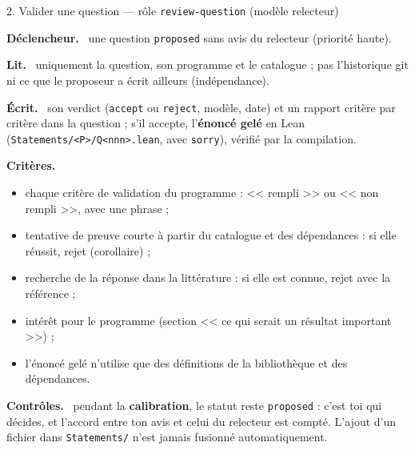 \documentclass[11pt,a4paper]{article}
\newcommand{\cmd}[1]{\texttt{#1}}
\newcommand{\rub}[1]{\par\smallskip\textsf{\textbf{#1.}}~}
\begin{document}
\begin{tache}{2. Valider une question --- rôle \cmd{review-question} (modèle relecteur)}
\rub{Déclencheur} une question \cmd{proposed} sans avis du relecteur (priorité haute).
\rub{Lit} uniquement la question, son programme et le catalogue ; pas l'historique git ni ce que le
proposeur a écrit ailleurs (indépendance).
\rub{Écrit} son verdict (\cmd{accept} ou \cmd{reject}, modèle, date) et un rapport critère par
critère dans la question ; s'il accepte, l'\textbf{énoncé gelé} en Lean
(\cmd{Statements/<P>/Q<nnn>.lean}, avec \cmd{sorry}), vérifié par la compilation.
\rub{Critères}
\begin{itemize}
\item chaque critère de validation du programme : << rempli >> ou << non rempli >>, avec une phrase ;
\item tentative de preuve courte à partir du catalogue et des dépendances : si elle réussit, rejet
  (corollaire) ;
\item recherche de la réponse dans la littérature : si elle est connue, rejet avec la référence ;
\item intérêt pour le programme (section << ce qui serait un résultat important >>) ;
\item l'énoncé gelé n'utilise que des définitions de la bibliothèque et des dépendances.
\end{itemize}
\rub{Contrôles} pendant la \textbf{calibration}, le statut reste \cmd{proposed} : c'est toi qui décides,
et l'accord entre ton avis et celui du relecteur est compté. L'ajout d'un fichier dans
\cmd{Statements/} n'est jamais fusionné automatiquement.
\end{tache}
\end{document}
